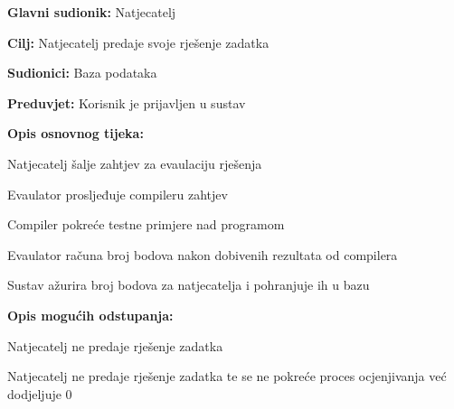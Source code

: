 					
					\noindent {}
					\begin{packed_item}
						
						\item \textbf{Glavni sudionik: }Natjecatelj
						\item  \textbf{Cilj:} Natjecatelj predaje svoje rješenje zadatka 
						\item  \textbf{Sudionici:} Baza podataka
						\item  \textbf{Preduvjet:} Korisnik je prijavljen u sustav 
						\item  \textbf{Opis osnovnog tijeka:}
						
						\item[] \begin{packed_enum}
							
							\item Natjecatelj šalje zahtjev za evaulaciju rješenja
							\item Evaulator prosljeđuje compileru zahtjev
							\item Compiler pokreće testne primjere nad programom
							\item Evaulator računa broj bodova nakon dobivenih rezultata od compilera
							\item Sustav ažurira broj bodova za natjecatelja i pohranjuje ih u bazu
							
						\end{packed_enum}
						
						\item  \textbf{Opis mogućih odstupanja:}
						
						\item[] \begin{packed_item}
							
							\item[2.a] Natjecatelj ne predaje rješenje zadatka
							\item[] \begin{packed_enum}
								
								\item Natjecatelj ne predaje rješenje zadatka te se ne pokreće proces ocjenjivanja već dodjeljuje 0 
								
							\end{packed_enum}
						\end{packed_item}
					\end{packed_item}
				
